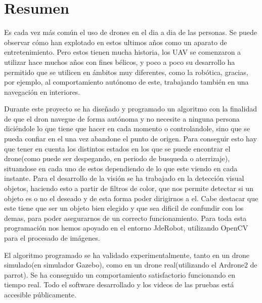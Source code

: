\chapter*{Resumen}
\hspace{1cm} Es cada vez m\'as com\'un el uso de drones en el dia a dia de las personas. Se puede observar c\'omo han explotado en estos ultimos años como un aparato de entretenimiento. Pero estos tienen mucha historia, los UAV se comenzaron a utilizar hace muchos años con fines b\'elicos, y poco a poco su desarrollo ha permitido que se utilicen en \'ambitos muy diferentes, como la rob\'otica, gracias, por ejemplo, al comportamiento aut\'onomo de este, trabajando tambi\'en en una navegaci\'on en interiores. 

\hspace{1cm} Durante este proyecto se ha diseñado y programado un algoritmo con la finalidad de que el dron navegue de forma aut\'onoma y no necesite a ninguna persona dici\'endole lo que tiene que hacer en cada momento o controlandole, sino que se pueda confiar en el una vez abandone el punto de origen. Para conseguir esto hay que tener en cuenta los distintos estados en los que se puede encontrar el drone(como puede ser despegando, en periodo de busqueda o aterrizaje), situandose en cada uno de estos dependiendo de lo que este viendo en cada instante. Para el desarrollo de la visi\'on se ha trabajado en la detecci\'on visual objetos, haciendo esto a partir de filtros de color, que nos permite detectar si un objeto es o no el deseado y de esta forma poder dirigirnos a el. Cabe destacar que este tiene que ser un objeto bien elegido y que sea dificil de confundir con los demas, para poder asegurarnos de un correcto funcionamiento. Para toda esta programaci\'on nos hemos apoyado en el entorno JdeRobot, utilizando OpenCV para el procesado de im\'agenes.

\hspace{1cm} El algoritmo programado se ha validado experimentalmente, tanto en un drone simulado(en simulador Gazebo), como en un drone real(utilizando el Ardrone2 de parrot). Se ha conseguido un comportamiento satisfactorio funcionando en tiempo real. Todo el software desarrollado y los videos de las pruebas est\'a accesible p\'ublicamente. 


 

